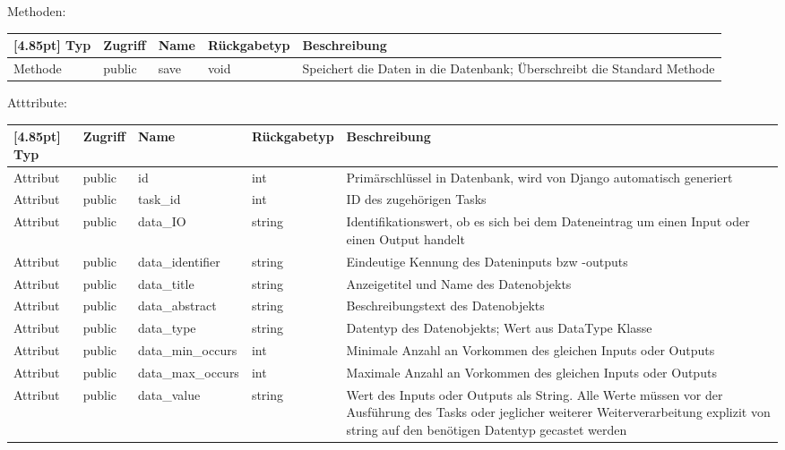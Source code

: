 	         Methoden:
	         \begin{center}
	         	\setlength\tabcolsep{5pt}
	         	\renewcommand{\arraystretch}{1.5}
	         	
	         	\begin{tabularx}{\textwidth}{|l|l|l|l|X|}
	         		\hline
	         		\rowcolor[gray]{0.75}[4.85pt]
	         		Typ & Zugriff & Name & Rückgabetyp & Beschreibung \\ \hline 
	         		Methode & public & save & void & Speichert die Daten in die Datenbank; Überschreibt die Standard Methode \\ 
	         		\hline
	         	\end{tabularx}
	         \end{center}
	         
	         Atttribute:
	         \begin{center}
	         	\setlength\tabcolsep{5pt}
	         	\renewcommand{\arraystretch}{1.5}
	         	
	         	\begin{tabularx}{\textwidth}{|l|l|l|l|X|}
	         		\hline
	         		\rowcolor[gray]{0.75}[4.85pt]
	         		Typ & Zugriff & Name & Rückgabetyp & Beschreibung \\ \hline 
	         		Attribut & public & id & int & Primärschlüssel in Datenbank, wird von Django automatisch generiert \\ \hline
	         		Attribut & public & task\_id & int & ID des zugehörigen Tasks\\ \hline
	         		Attribut & public & data\_IO & string & Identifikationswert, ob es sich bei dem Dateneintrag um einen Input oder einen Output handelt\\ \hline
	         		Attribut & public & data\_identifier & string & Eindeutige Kennung des Dateninputs bzw -outputs\\ \hline
	         		Attribut & public & data\_title & string & Anzeigetitel und Name des Datenobjekts\\ \hline
	         		Attribut & public & data\_abstract & string & Beschreibungstext des Datenobjekts\\ \hline
	         		Attribut & public & data\_type & string & Datentyp des Datenobjekts; Wert aus DataType Klasse \\ \hline
	         		Attribut & public & data\_min\_occurs & int & Minimale Anzahl an Vorkommen des gleichen Inputs oder Outputs \\ \hline
	         		Attribut & public & data\_max\_occurs & int & Maximale Anzahl an Vorkommen des gleichen Inputs oder Outputs \\ \hline
	         		Attribut & public & data\_value & string & Wert des Inputs oder Outputs als String. Alle Werte müssen vor der Ausführung des Tasks oder jeglicher weiterer Weiterverarbeitung explizit von string auf den benötigen Datentyp gecastet werden\\
	         		\hline
	         	\end{tabularx}
	         \end{center}
            
